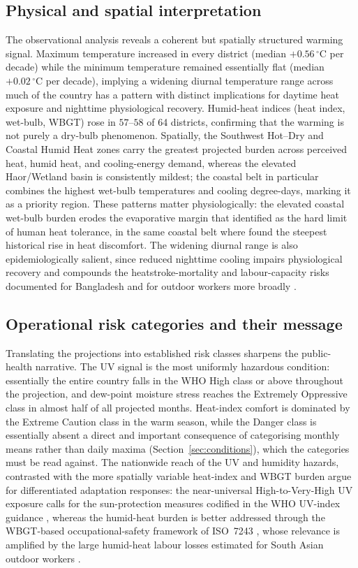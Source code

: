 \documentclass[review,11pt]{elsarticle}
\newcommand{\degC}{\ensuremath{^{\circ}\mathrm{C}}}
\begin{document}
\subsection{Physical and spatial interpretation}
The observational analysis reveals a coherent but spatially structured warming
signal. Maximum temperature increased in every district (median $+0.56\,\degC$
per decade) while the minimum temperature remained essentially flat (median
$+0.02\,\degC$ per decade), implying a widening diurnal temperature range across
much of the country has a pattern with distinct implications for daytime heat
exposure and nighttime physiological recovery. Humid-heat indices (heat index,
wet-bulb, WBGT) rose in $57$--$58$ of 64 districts, confirming that the warming is
not purely a dry-bulb phenomenon. Spatially, the Southwest Hot--Dry and Coastal
Humid Heat zones carry the greatest projected burden across perceived heat,
humid heat, and cooling-energy demand, whereas the elevated Haor/Wetland basin is
consistently mildest; the coastal belt in particular combines the highest
wet-bulb temperatures and cooling degree-days, marking it as a priority region.
These patterns matter physiologically: the elevated coastal wet-bulb burden erodes
the evaporative margin that \citet{raymond2020} identified as the hard limit of
human heat tolerance, in the same coastal belt where \citet{tanim2024heat} found
the steepest historical rise in heat discomfort. The widening diurnal range is also
epidemiologically salient, since reduced nighttime cooling impairs physiological
recovery and compounds the heatstroke-mortality and labour-capacity risks
documented for Bangladesh and for outdoor workers more broadly
\citep{miah2026,flouris2022}.

\subsection{Operational risk categories and their message}
Translating the projections into established risk classes sharpens the
public-health narrative. The UV signal is the most uniformly hazardous condition:
essentially the entire country falls in the WHO High class or above throughout the
projection, and dew-point moisture stress reaches the Extremely Oppressive class
in almost half of all projected months. Heat-index comfort is dominated by the
Extreme Caution class in the warm season, while the Danger class is essentially
absent a direct and important consequence of categorising monthly means rather
than daily maxima (Section~\ref{sec:conditions}), which the categories must be
read against. The nationwide reach of the UV and humidity hazards, contrasted with
the more spatially variable heat-index and WBGT burden argue for differentiated
adaptation responses: the near-universal High-to-Very-High UV exposure calls for
the sun-protection measures codified in the WHO UV-index guidance \citep{who2002},
whereas the humid-heat burden is better addressed through the WBGT-based
occupational-safety framework of ISO~7243 \citep{iso7243_2017,parsons2006}, whose
relevance is amplified by the large humid-heat labour losses estimated for South
Asian outdoor workers \citep{parsons2021labor}.
\end{document}
